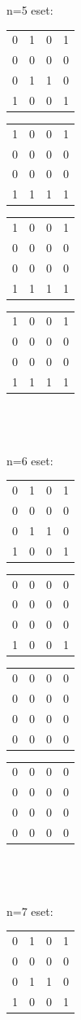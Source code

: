 \documentclass[paper=a4, fontsize=11pt]{article}
\begin{document}
n=5 eset:
\begin{tabular}{cccc}
0&1&0&1\\
0&0&0&0\\
0&1&1&0\\
1&0&0&1
\end{tabular}
\quad
\begin{tabular}{cccc}
1&0&0&1\\
0&0&0&0\\
0&0&0&0\\
1&1&1&1
\end{tabular}
\quad
\begin{tabular}{cccc}
1&0&0&1\\
0&0&0&0\\
0&0&0&0\\
1&1&1&1
\end{tabular}
\quad
\begin{tabular}{cccc}
1&0&0&1\\
0&0&0&0\\
0&0&0&0\\
1&1&1&1
\end{tabular}
\\
\\
\\
n=6 eset:
\begin{tabular}{cccc}
0&1&0&1\\
0&0&0&0\\
0&1&1&0\\
1&0&0&1
\end{tabular}
\quad
\begin{tabular}{cccc}
0&0&0&0\\
0&0&0&0\\
0&0&0&0\\
1&0&0&1
\end{tabular}
\quad
\begin{tabular}{cccc}
0&0&0&0\\
0&0&0&0\\
0&0&0&0\\
0&0&0&0
\end{tabular}
\quad
\begin{tabular}{cccc}
0&0&0&0\\
0&0&0&0\\
0&0&0&0\\
0&0&0&0
\end{tabular}
\\
\\
\\
n=7 eset:
\begin{tabular}{cccc}
0&1&0&1\\
0&0&0&0\\
0&1&1&0\\
1&0&0&1
\end{tabular}
\end{document}
